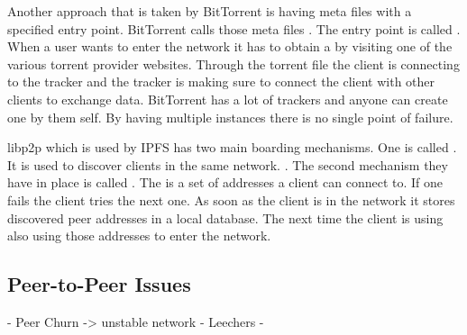 Another approach that is taken by BitTorrent is having meta files with a specified entry point. BitTorrent calls those meta files . The entry point is called . When a user wants to enter the network it has to obtain a  by visiting one of the various torrent provider websites. Through the torrent file the client is connecting to the tracker and the tracker is making sure to connect the client with other clients to exchange data. BitTorrent has a lot of trackers and anyone can create one by them self. By having multiple instances there is no single point of failure.

libp2p which is used by IPFS has two main boarding mechanisms. One is called . It is used to discover clients in the same network. \cite{ipfs-bootstrapping}.
The second mechanism they have in place is called . The  is a set of addresses a client can connect to. If one fails the client tries the next one. As soon as the client is in the network it stores discovered peer addresses in a local database. The next time the client is using also using those addresses to enter the network.

\subsection{Peer-to-Peer Issues}
- Peer Churn -> unstable network
- Leechers
- 
